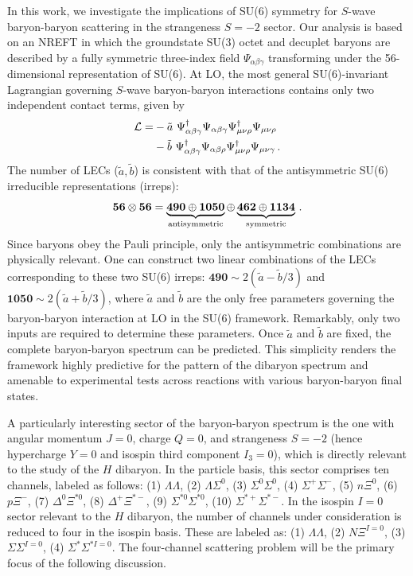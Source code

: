\documentclass[prl,showpacs,twocolumn,superscriptaddress,floatfix,10pt,footinbib]{revtex4-2}
\newcommand{\nt}{\notag\\}
\begin{document}
In this work, we investigate the implications of SU(6) symmetry for $S$-wave baryon-baryon scattering in the strangeness $S=-2$ sector. Our analysis is based on an NREFT in which the groundstate SU(3) octet and decuplet baryons are described by a fully symmetric three-index field $\Psi_{\alpha\beta\gamma}$ transforming under the 56-dimensional representation of SU(6). At LO, the most general SU(6)-invariant Lagrangian governing $S$-wave baryon-baryon interactions contains only two independent contact terms, given by~\cite{Kaplan:1995yg}
\begin{align}\label{eq:su6Lag}
\mathcal{L}=&-\tilde{a}~\Psi^\dagger_{\alpha\beta\gamma}\Psi_{\alpha\beta\gamma}\Psi^\dagger_{\mu\nu\rho}\Psi_{\mu\nu\rho}\nt
&-\tilde{b}~\Psi^\dagger_{\alpha\beta\gamma}\Psi_{\alpha\beta\rho}\Psi^\dagger_{\mu\nu\rho}\Psi_{\mu\nu\gamma}\,.
\end{align}
The number of LECs ($\tilde{a},\tilde{b}$) is consistent with that of the antisymmetric SU(6) irreducible representations (irreps):
\begin{equation}
\bm{56} \otimes \bm{56}=\underbrace{\bm{490} \oplus \bm{1050}}_{\rm antisymmetric}\oplus \underbrace{\bm{462}\oplus \bm{1134}}_{\rm symmetric}\,.
\end{equation}
Since baryons obey the Pauli principle, only the antisymmetric combinations are physically relevant. One can construct two linear combinations of the LECs corresponding to these two SU(6) irreps: $\bm{490}\sim2( \tilde{a}-\tilde{b}/3 )$ and $\bm{1050}\sim2( \tilde{a}+\tilde{b}/3 )$, where $\tilde{a}$ and $\tilde{b}$ are the only free parameters governing the baryon-baryon interaction at LO in the SU(6) framework. Remarkably, only two inputs are required to determine these parameters. Once $\tilde{a}$ and $\tilde{b}$ are fixed, the complete baryon-baryon spectrum can be predicted. This simplicity renders the framework highly predictive for the pattern of the dibaryon spectrum and amenable to experimental tests across reactions with various baryon-baryon final states.

A particularly interesting sector of the baryon-baryon spectrum is the one with angular momentum $J=0$, charge $Q=0$, and strangeness $S=-2$ (hence hypercharge $Y=0$ and isospin third component $I_3=0$), which is directly relevant to the study of the $H$ dibaryon. In the particle basis, this sector comprises ten channels, labeled as follows: (1) $\Lambda \Lambda$, (2) $\Lambda \Sigma ^0$, (3) $\Sigma ^0\Sigma ^0$, (4) $\Sigma ^+\Sigma ^-$, (5) $n\Xi ^0$, (6) $p\Xi ^-$, (7) $\Delta ^0\Xi ^{*0}$, (8) $\Delta ^+\Xi ^{*-}$, (9) $\Sigma ^{*0}\Sigma ^{*0}$, (10) $\Sigma ^{*+}\Sigma ^{*-}$. In the isospin $I=0$ sector relevant to the $H$ dibaryon, the number of channels under consideration is reduced to four in the isospin basis. These are labeled as: (1) $\Lambda \Lambda$, (2) $N\Xi^{I=0}$, (3) $\Sigma\Sigma^{I=0}$, (4) $\Sigma ^{*}\Sigma ^{*I=0}$. The four-channel scattering problem will be the primary focus of the following discussion.
\end{document}
